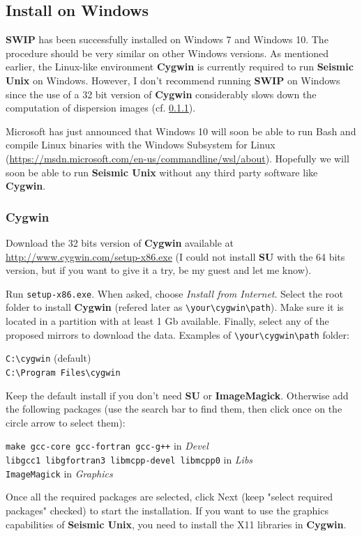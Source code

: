 \documentclass[twoside,a4paper]{article}
\def\SWIP{\textbf{SWIP}}
\def\SU{\textbf{SU}}
\def\SeismicUnix{\textbf{Seismic Unix}}
\def\ImageMagick{\textbf{ImageMagick}}
\def\Cygwin{\textbf{Cygwin}}
\begin{document}
\clearpage
\subsection{Install on Windows}
{\SWIP} has been successfully installed on Windows 7 and Windows 10. The procedure should be very similar on other Windows versions. As mentioned earlier, the Linux-like environment {\Cygwin} is currently required to run {\SeismicUnix} on Windows. However, I don't recommend running {\SWIP} on Windows since the use of a 32 bit version of {\Cygwin} considerably slows down the computation of dispersion images (cf. \ref{sec:cygwin}).

Microsoft has just announced that Windows 10 will soon be able to run Bash and compile Linux binaries with the Windows Subsystem for Linux (\url{https://msdn.microsoft.com/en-us/commandline/wsl/about}). Hopefully we will soon be able to run {\SeismicUnix} without any third party software like {\Cygwin}.

\subsubsection{Cygwin}
\label{sec:cygwin}
Download the 32 bits version of {\Cygwin} available at \url{http://www.cygwin.com/setup-x86.exe} (I could not install {\SU} with the 64 bits version, but if you want to give it a try, be my guest and let me know).

Run \verb|setup-x86.exe|. When asked, choose \textit{Install from Internet}. Select the root folder to install {\Cygwin} (refered later as \verb|\your\cygwin\path|). Make sure it is located in a partition with at least 1 Gb available. Finally, select any of the proposed mirrors to download the data.
Examples of \verb|\your\cygwin\path| folder:

\verb|C:\cygwin| (default)\\
\verb|C:\Program Files\cygwin|

Keep the default install if you don't need {\SU} or {\ImageMagick}. Otherwise add the following packages (use the search bar to find them, then click once on the circle arrow to select them):

\verb|make gcc-core gcc-fortran gcc-g++| in \textit{Devel}\\
\verb|libgcc1 libgfortran3 libmcpp-devel libmcpp0| in \textit{Libs}\\
\verb|ImageMagick| in \textit{Graphics}

Once all the required packages are selected, click Next (keep "select required packages" checked) to start the installation. If you want to use the graphics capabilities of {\SeismicUnix}, you need to install the X11 libraries in {\Cygwin}.
\end{document}
